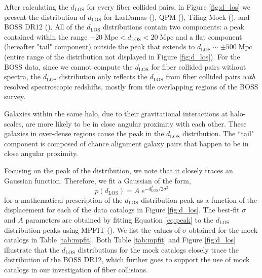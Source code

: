 \documentclass{emulateapj}
\begin{document}
After calculating the $d_{\mathrm{LOS}}$ for every fiber collided pairs, in Figure \ref{fig:d_los} we present the distribution of $d_{\mathrm{LOS}}$ for LasDamas (\ldgcolor), QPM (\qpmcolor), Tiling Mock (\tmcolor), and BOSS DR12 (\cmasscolor). All of the $d_{\mathrm{LOS}}$ distributions contain two components: a peak contained within the range $-20\;\mathrm{Mpc} < d_{\mathrm{LOS}} < 20\;\mathrm{Mpc}$ and a flat component (hereafter "tail" component) outside the peak that extends to $d_{\mathrm{LOS}} \sim \pm 500 \;\mathrm{Mpc}$ (entire range of the distribution not displayed in Figure \ref{fig:d_los}). For the BOSS data, since we cannot compute the $d_\mathrm{LOS}$ for fiber collided pairs without spectra, the $d_\mathrm{LOS}$ distribution only reflects the $d_\mathrm{LOS}$ from fiber collided pairs {\em with} resolved spectroscopic redshifts, mostly from tile overlapping regions of the BOSS survey.

Galaxies within the same halo, due to their gravitational interactions at halo-scales, are more likely to be in close angular proximity with each other. These galaxies in over-dense regions cause the peak in the $d_{\mathrm{LOS}}$ distribution. The ``tail" component is composed of chance alignment galaxy pairs that happen to be in close angular proximity. 

Focusing on the peak of the distribution, we note that it closely traces an Gaussian function. Therefore, we fit a Gaussian of the form, 
\begin{equation} \label{eq:peak} 
p(d_{\mathrm{LOS}}) = A \; e^{-{d_{\mathrm{LOS}}^2}/{2\sigma^2}}
\end{equation}
 for a mathematical prescription of the $d_{\mathrm{LOS}}$ distribution peak as a function of the displacement for each of the data catalogs in Figure \ref{fig:d_los}. The best-fit $\sigma$ and $A$ parameters are obtained by fitting Equation \ref{eq:peak} to the $d_{\mathrm{LOS}}$ distribution peaks using MPFIT (\citealt{Markwardt:2009aa}). We list the values of $\sigma$ obtained for the mock catalogs in Table \ref{tab:mpfit}. Both Table \ref{tab:mpfit} and Figure \ref{fig:d_los} illustrate that the $d_{\mathrm{LOS}}$ distributions for the mock catalogs closely trace the distribution of the BOSS DR12, which further goes to support the use of mock catalogs in our investigation of fiber collisions.  
 
\end{document}
